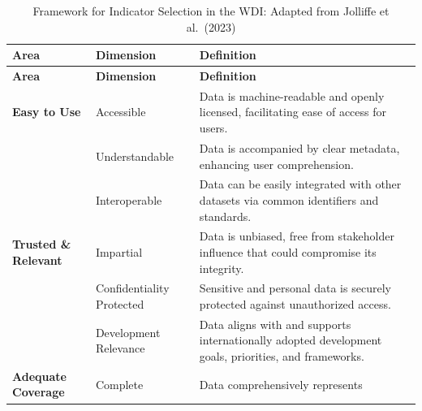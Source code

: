 \documentclass[
  11pt,
  a4paper,
  DIV=11,
  numbers=noendperiod]{scrreprt}
\begin{document}
\begin{longtable}[]{@{}
  >{\raggedright\arraybackslash}p{}
  >{\raggedright\arraybackslash}p{}
  >{\raggedright\arraybackslash}p{}@{}}
\caption{Framework for Indicator Selection in the WDI: Adapted from
Jolliffe et al.~(2023)}\label{tbl-2_1}\tabularnewline
\toprule\noalign{}
\begin{minipage}[b]{\linewidth}\raggedright
\textbf{Area}
\end{minipage} & \begin{minipage}[b]{\linewidth}\raggedright
\textbf{Dimension}
\end{minipage} & \begin{minipage}[b]{\linewidth}\raggedright
\textbf{Definition}
\end{minipage} \\
\midrule\noalign{}
\endfirsthead
\toprule\noalign{}
\begin{minipage}[b]{\linewidth}\raggedright
\textbf{Area}
\end{minipage} & \begin{minipage}[b]{\linewidth}\raggedright
\textbf{Dimension}
\end{minipage} & \begin{minipage}[b]{\linewidth}\raggedright
\textbf{Definition}
\end{minipage} \\
\midrule\noalign{}
\endhead
\bottomrule\noalign{}
\endlastfoot
\textbf{Easy to Use} & Accessible & Data is machine-readable and openly
licensed, facilitating ease of access for users. \\
& Understandable & Data is accompanied by clear metadata, enhancing user
comprehension. \\
& Interoperable & Data can be easily integrated with other datasets via
common identifiers and standards. \\
\textbf{Trusted \& Relevant} & Impartial & Data is unbiased, free from
stakeholder influence that could compromise its integrity. \\
& Confidentiality Protected & Sensitive and personal data is securely
protected against unauthorized access. \\
& Development Relevance & Data aligns with and supports internationally
adopted development goals, priorities, and frameworks. \\
\textbf{Adequate Coverage} & Complete & Data comprehensively represents

\end{longtable}
\end{document}
